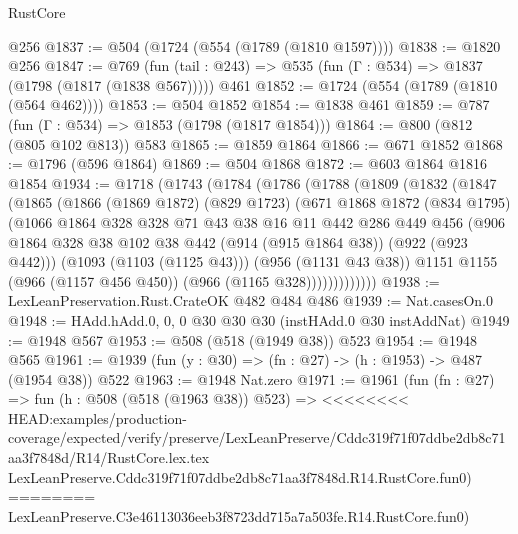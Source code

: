 \begin{lexlean}{RustCore}
\begin{coremodule}
{\begin{coremodule}
{{{{{{{    @256
@1837 := @504 (@1724 (@554 (@1789 (@1810 @1597))))
@1838 := @1820 @256
@1847 := @769
    (fun (tail : @243) => @535 (fun (Γ : @534) => @1837 (@1798 (@1817 (@1838 @567)))))
    @461
@1852 := @1724 (@554 (@1789 (@1810 (@564 @462))))
@1853 := @504 @1852
@1854 := @1838 @461
@1859 := @787 (fun (Γ : @534) => @1853 (@1798 (@1817 @1854)))
@1864 := @800 (@812 (@805 @102 @813)) @583
@1865 := @1859 @1864
@1866 := @671 @1852
@1868 := @1796 (@596 @1864)
@1869 := @504 @1868
@1872 := @603 @1864 @1816 @1854
@1934 := @1718
    (@1743
      (@1784
        (@1786
          (@1788
            (@1809
              (@1832
                (@1847
                  (@1865
                    (@1866
                      (@1869 @1872)
                      (@829 @1723)
                      (@671
                        @1868
                        @1872
                        (@834 @1795)
                        (@1066
                          @1864
                          @328
                          @328
                          @71
                          @43
                          @38
                          @16
                          @11
                          @442
                          @286
                          @449
                          @456
                          (@906
                            @1864
                            @328
                            @38
                            @102
                            @38
                            @442
                            (@914 (@915 @1864 @38))
                            (@922 (@923 @442)))
                          (@1093 (@1103 (@1125 @43)))
                          (@956 (@1131 @43 @38))
                          @1151
                          @1155
                          (@966 (@1157 @456 @450))
                          (@966 (@1165 @328)))))))))))))
@1938 := LexLeanPreservation.Rust.CrateOK @482 @484 @486
@1939 := Nat.casesOn.{0}
@1948 := HAdd.hAdd.{0, 0, 0} @30 @30 @30 (instHAdd.{0} @30 instAddNat)
@1949 := @1948 @567
@1953 := @508 (@518 (@1949 @38)) @523
@1954 := @1948 @565
@1961 := @1939 (fun (y : @30) => (fn : @27) -> (h : @1953) -> @487 (@1954 @38)) @522
@1963 := @1948 Nat.zero
@1971 := @1961
    (fun (fn : @27) =>
    fun (h : @508 (@518 (@1963 @38)) @523) =>
<<<<<<<< HEAD:examples/production-coverage/expected/verify/preserve/LexLeanPreserve/Cddc319f71f07ddbe2db8c71aa3f7848d/R14/RustCore.lex.tex
    LexLeanPreserve.Cddc319f71f07ddbe2db8c71aa3f7848d.R14.RustCore.fun0)
========
    LexLeanPreserve.C3e46113036eeb3f8723dd715a7a503fe.R14.RustCore.fun0)
}}}}}}}
\end{coremodule}}
\end{coremodule}
\end{lexlean}
